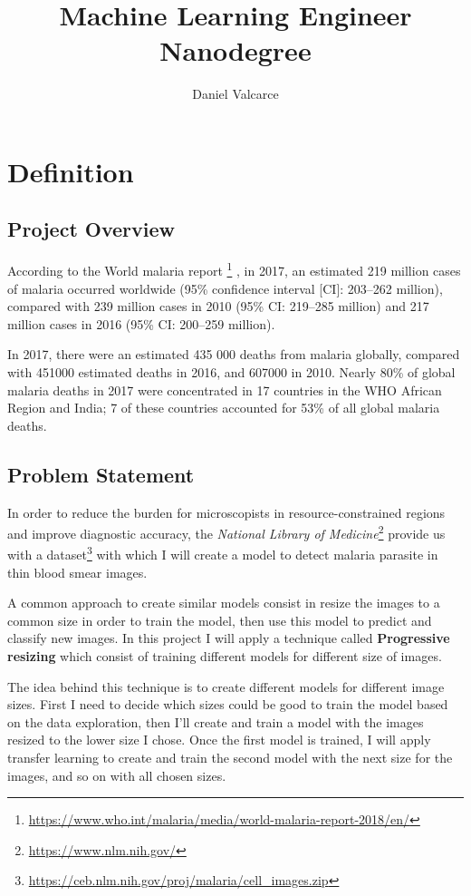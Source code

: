 \documentclass[a4paper]{article}
\title{Machine Learning Engineer Nanodegree}
\author{Daniel Valcarce}
\begin{document}
	\maketitle
	\newpage
	
	\section{Definition}
	\subsection{Project Overview}
	According to the World malaria report \footnote{\label{malaria_report}\url{https://www.who.int/malaria/media/world-malaria-report-2018/en/}} , in 2017, an estimated 219 million cases of malaria
	occurred worldwide (95\% confidence interval [CI]: 203–262 million), compared with 239
	million cases in 2010 (95\% CI: 219–285 million) and 217 million cases in 2016 (95\% CI: 200–259
	million).
	
	\medskip
	In 2017, there were an estimated 435 000 deaths from malaria globally, compared with
	451000 estimated deaths in 2016, and 607000 in 2010. Nearly 80\% of global malaria deaths in
	2017 were concentrated in 17 countries in the WHO African Region and India; 7 of these
	countries accounted for 53\% of all global malaria deaths.

	\subsection{Problem Statement}
	In order to reduce the burden for microscopists in resource-constrained regions and improve
	diagnostic accuracy, the \textit{National Library of Medicine}\footnote{\label{nlm_web}\url{https://www.nlm.nih.gov/}} provide us with a dataset\footnote{\label{dataset}\url{https://ceb.nlm.nih.gov/proj/malaria/cell_images.zip}} with which I
	will create a model to detect malaria parasite in thin blood smear images.
	
	\medskip
	A common approach to create similar models consist in resize the images to a common size in order to train the model, then use this model to predict and classify new images. In this project I will apply a technique called \textbf{Progressive resizing} which consist of training different models for different size of images.
	
	\medskip
	The idea behind this technique is to create different models for different image sizes. First I need to decide which sizes could be good to train the model based on the data exploration, then I'll create and train a model with the images resized to the lower size I chose. Once the first model is trained, I will apply transfer learning to create and train the second model with the next size for the images, and so on with all chosen sizes.
	
\end{document}
